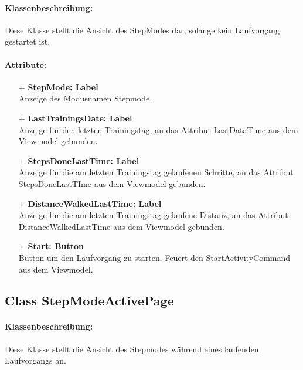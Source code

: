 \documentclass[a4paper,12pt]{article}
\begin{document}
\paragraph{Klassenbeschreibung:}
Diese Klasse stellt die Ansicht des StepModes dar, solange kein Laufvorgang gestartet ist.
\paragraph{Attribute:}
	\begin{itemize}
	\item[+] \textbf{StepMode: Label} \\ Anzeige des Modusnamen Stepmode.
	\item[+] \textbf{LastTrainingsDate: Label} \\ Anzeige für den letzten Trainingstag, an das Attribut LastDataTime aus dem Viewmodel gebunden.
	\item[+] \textbf{StepsDoneLastTime: Label} \\ Anzeige für die am letzten Trainingstag gelaufenen Schritte, an das Attribut StepsDoneLastTIme aus dem Viewmodel gebunden.
	\item[+] \textbf{DistanceWalkedLastTime: Label} \\ Anzeige für die am letzten Trainingstag gelaufene Distanz, an das Attribut DistanceWalkedLastTime aus dem Viewmodel gebunden. 
	\item[+] \textbf{Start: Button} \\ Button um den Laufvorgang zu starten. Feuert den StartActivityCommand aus dem Viewmodel.
	\end{itemize}

\subsection{Class StepModeActivePage}
\paragraph{Klassenbeschreibung:}
Diese Klasse stellt die Ansicht des Stepmodes während eines laufenden Laufvorgangs an.
\end{document}
